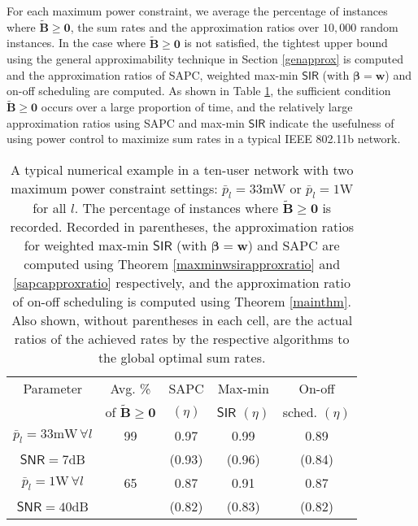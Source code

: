 \documentclass[10pt,twocolumn]{IEEEtran}
\newcommand{\0}{\mathbf{0}}
\newcommand{\1}{\mathbf{1}}
\begin{document}
For each maximum power constraint, we average the percentage of instances where $\mathbf{\tilde{B}} \ge \mathbf{0}$, the sum rates and the approximation ratios over $10,000$ random instances. In the case where $\mathbf{\tilde{B}} \ge \mathbf{0}$ is not satisfied, the tightest upper bound using the general approximability technique in Section \ref{genapprox} is computed and the approximation ratios of SAPC, weighted max-min $\mathsf{SIR}$ (with $\boldsymbol{\beta}=\mathbf{w}$) and on-off scheduling are computed. As shown in Table \ref{table:adhoc}, the sufficient condition $\mathbf{\tilde{B}} \ge \mathbf{0}$ occurs over a large proportion of time, and the relatively large approximation ratios using SAPC and max-min $\mathsf{SIR}$ indicate the usefulness of using power control to maximize sum rates in a typical IEEE 802.11b network. 

\begin{table}
\begin{center}
\begin{tabular}{||c|c|c|c|c||} \hline
Parameter  & Avg. \% & SAPC &
Max-min & On-off \\
\;  & of $\mathbf{\tilde{B}} \ge \mathbf{0}$ & $(\eta)$ & $\mathsf{SIR}$ $(\eta)$ & sched. $(\eta)$ \\
\hline \hline 
$\bar{p}_l=33\mbox{mW} \, \forall l$ & 99 &  0.97  &  0.99    &   0.89   \\
$\mathsf{SNR}=7$dB     &    &  (0.93) &  (0.96) & (0.84)   \\ \hline
$\bar{p}_l=1\mbox{W} \, \forall l$  &  65  &   0.87   &  0.91   &    0.87   \\
$\mathsf{SNR}=40$dB & \, &  (0.82)  &   (0.83)    &  (0.82)   \\    \hline
\hline
\end{tabular}
\caption{A typical numerical example in a ten-user network with two maximum power constraint settings: $\bar{p}_l=33$mW or $\bar{p}_l=1$W for all $l$. The percentage of instances where $\mathbf{\tilde{B}} \ge \mathbf{0}$ is recorded. Recorded in parentheses, the approximation ratios for weighted max-min $\mathsf{SIR}$ (with $\boldsymbol{\beta}=\mathbf{w}$) and SAPC are computed using Theorem \ref{maxminwsirapproxratio} and \ref{sapcapproxratio} respectively, and the approximation ratio of on-off scheduling is computed using Theorem \ref{mainthm}. Also shown, without parentheses in each cell, are the actual ratios of the achieved rates by the respective algorithms to the global optimal sum rates.}
\label{table:adhoc}
\end{center}
\end{table}
\end{document}
